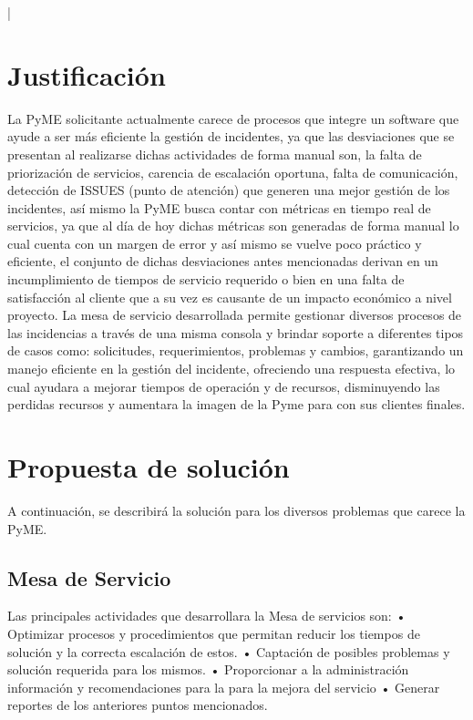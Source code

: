 |	
\section{Justificación}


La PyME solicitante actualmente carece de procesos que integre un software que ayude a ser más eficiente la  gestión de incidentes, ya que las desviaciones que se presentan  al realizarse dichas actividades de forma manual son, la falta de priorización de servicios, carencia de escalación  oportuna, falta de  comunicación, detección de ISSUES (punto de atención) que generen una mejor gestión de los incidentes, así mismo la PyME busca contar con métricas en tiempo real de servicios, ya que al día de hoy  dichas métricas son generadas de forma manual lo cual  cuenta con un margen de error y así mismo se vuelve poco práctico y eficiente, el conjunto de dichas desviaciones antes mencionadas derivan en un incumplimiento de tiempos de servicio requerido o bien en una falta de satisfacción al cliente que a su vez es causante de un impacto económico a nivel proyecto.
La mesa de servicio desarrollada permite gestionar diversos procesos de las incidencias a través de una misma consola y brindar soporte a diferentes tipos de casos como: solicitudes, requerimientos, problemas y cambios, garantizando un manejo eficiente en la gestión del incidente, ofreciendo una respuesta efectiva, lo cual ayudara a mejorar tiempos de operación y de recursos, disminuyendo las perdidas recursos y aumentara la imagen de la Pyme para con sus clientes finales.






\section{Propuesta de solución}

A continuación, se describirá la solución para los diversos problemas que carece la PyME.
\subsection{Mesa de Servicio}
Las principales actividades que desarrollara la Mesa de servicios son: 
•	Optimizar procesos y procedimientos que permitan reducir los tiempos de solución y la correcta escalación de estos.
•	Captación de posibles problemas y solución requerida para los mismos. 
•	Proporcionar a la administración información y recomendaciones para la para la mejora del servicio
•	Generar reportes de los anteriores puntos mencionados.

